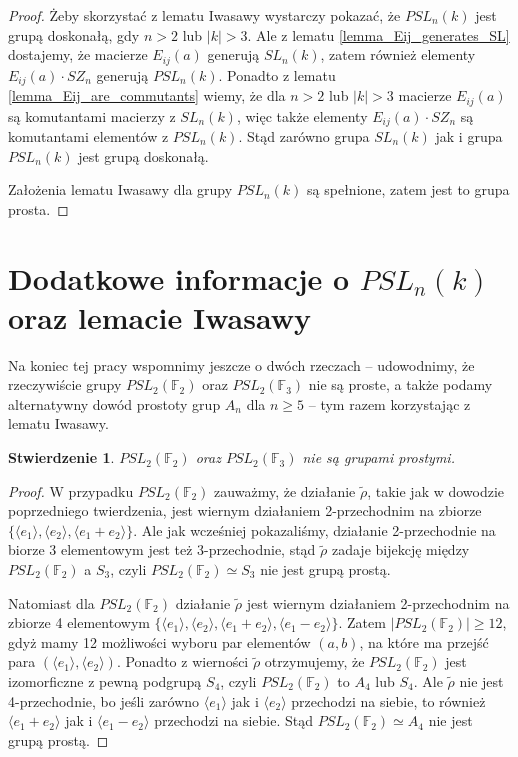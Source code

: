 \documentclass[licencjacka]{pracamgr}
\newtheorem{fact}{Stwierdzenie}[section]
\begin{document}
\begin{proof}
  Żeby skorzystać z lematu Iwasawy wystarczy pokazać, że $PSL_n(k)$ jest grupą doskonałą, 
  gdy $n > 2$ lub $|k| > 3$.
  Ale z lematu \ref{lemma_Eij_generates_SL} dostajemy, że macierze $E_{i j}(a)$ generują $SL_n(k)$,
  zatem również elementy $E_{i j}(a) \cdot SZ_n$ generują $PSL_n(k)$.
  Ponadto z lematu \ref{lemma_Eij_are_commutants} wiemy, że dla $n > 2$ lub $|k| > 3$ macierze $E_{i j}(a)$ 
  są komutantami macierzy z $SL_n(k)$, więc także elementy $E_{i j}(a) \cdot SZ_n$ są komutantami elementów z $PSL_n(k)$.
  Stąd zarówno grupa $SL_n(k)$ jak i grupa $PSL_n(k)$ jest grupą doskonałą.
  
  Założenia lematu Iwasawy dla grupy $PSL_n(k)$ są spełnione, zatem jest to grupa prosta.
\end{proof}

\section{Dodatkowe informacje o $PSL_n(k)$ oraz lemacie Iwasawy}

Na koniec tej pracy wspomnimy jeszcze o dwóch rzeczach -- udowodnimy, że rzeczywiście 
grupy $PSL_2(\mathbb{F}_2)$ oraz $PSL_2(\mathbb{F}_3)$ nie są proste,
a także podamy alternatywny dowód prostoty grup $A_n$ dla $n \ge 5$ -- tym razem korzystając z lematu Iwasawy.

\begin{fact}
  $PSL_2(\mathbb{F}_2)$ oraz $PSL_2(\mathbb{F}_3)$ nie są grupami prostymi.
\end{fact}
\begin{proof}
  W przypadku $PSL_2(\mathbb{F}_2)$ zauważmy, że działanie $\tilde{\rho}$, takie jak w dowodzie poprzedniego twierdzenia,
  jest wiernym działaniem 2-przechodnim na zbiorze  $\{ \langle e_1 \rangle, \langle e_2 \rangle, \langle e_1 + e_2 \rangle\}$.
  Ale jak wcześniej pokazaliśmy, działanie 2-przechodnie na biorze 3 elementowym jest też 3-przechodnie, 
  stąd $\tilde{\rho}$ zadaje bijekcję między $PSL_2(\mathbb{F}_2)$ a $S_3$, 
  czyli $PSL_2(\mathbb{F}_2) \simeq S_3$ nie jest grupą prostą.

  Natomiast dla $PSL_2(\mathbb{F}_2)$ działanie $\tilde{\rho}$
  jest wiernym działaniem 2-przechodnim na zbiorze 4 elementowym
  $\{ \langle e_1 \rangle, \langle e_2 \rangle, \langle e_1 + e_2 \rangle, \langle e_1 - e_2 \rangle \}$.
  Zatem $| PSL_2(\mathbb{F}_2) | \ge 12$, gdyż mamy 12 możliwości wyboru par elementów $(a, b)$, 
  na które ma przejść para $(\langle e_1 \rangle, \langle e_2 \rangle)$.
  Ponadto z wierności $\tilde{\rho}$ otrzymujemy, że $PSL_2(\mathbb{F}_2)$ jest izomorficzne z pewną podgrupą $S_4$,
  czyli $PSL_2(\mathbb{F}_2)$ to $A_4$ lub $S_4$.
  Ale $\tilde{\rho}$ nie jest 4-przechodnie, bo jeśli zarówno $\langle e_1 \rangle$ jak i $\langle e_2 \rangle$ przechodzi na siebie,
  to również $\langle e_1 + e_2 \rangle$ jak i $\langle e_1 - e_2 \rangle$ przechodzi na siebie.
  Stąd $PSL_2(\mathbb{F}_2) \simeq A_4$ nie jest grupą prostą.
\end{proof}
\end{document}
